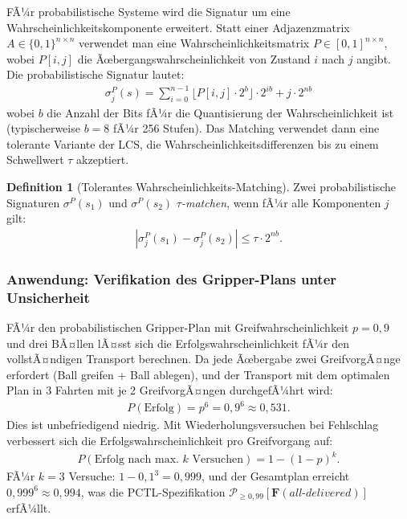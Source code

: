 ﻿\documentclass[a4paper,12pt]{article}
\theoremstyle{definition}
\newtheorem{definition}{Definition}[section]
\begin{document}
FÃ¼r probabilistische Systeme wird die Signatur um eine Wahrscheinlichkeitskomponente erweitert. Statt einer Adjazenzmatrix $A \in \{0,1\}^{n \times n}$ verwendet man eine Wahrscheinlichkeitsmatrix $P \in [0,1]^{n \times n}$, wobei $P[i,j]$ die Ãœbergangswahrscheinlichkeit von Zustand $i$ nach $j$ angibt. Die probabilistische Signatur lautet:
\begin{align}
  \sigma_j^P(s) = \sum_{i=0}^{n-1} \lfloor P[i,j] \cdot 2^b \rfloor \cdot 2^{ib} + j \cdot 2^{nb}
\end{align}
wobei $b$ die Anzahl der Bits fÃ¼r die Quantisierung der Wahrscheinlichkeit ist (typischerweise $b = 8$ fÃ¼r 256 Stufen). Das Matching verwendet dann eine tolerante Variante der LCS, die Wahrscheinlichkeitsdifferenzen bis zu einem Schwellwert $\tau$ akzeptiert.

\begin{definition}[Tolerantes Wahrscheinlichkeits-Matching]
Zwei probabilistische Signaturen $\sigma^P(s_1)$ und $\sigma^P(s_2)$ \emph{$\tau$-matchen}, wenn fÃ¼r alle Komponenten $j$ gilt:
\begin{align}
  |\sigma_j^P(s_1) - \sigma_j^P(s_2)| \leq \tau \cdot 2^{nb}.
\end{align}
\end{definition}

\subsubsection{Anwendung: Verifikation des Gripper-Plans unter Unsicherheit}

FÃ¼r den probabilistischen Gripper-Plan mit Greifwahrscheinlichkeit $p = 0{,}9$ und drei BÃ¤llen lÃ¤sst sich die Erfolgswahrscheinlichkeit fÃ¼r den vollstÃ¤ndigen Transport berechnen. Da jede Ãœbergabe zwei GreifvorgÃ¤nge erfordert (Ball greifen + Ball ablegen), und der Transport mit dem optimalen Plan in 3 Fahrten mit je 2 GreifvorgÃ¤ngen durchgefÃ¼hrt wird:
\begin{align}
  P(\text{Erfolg}) = p^6 = 0{,}9^6 \approx 0{,}531.
\end{align}
Dies ist unbefriedigend niedrig. Mit Wiederholungsversuchen bei Fehlschlag verbessert sich die Erfolgswahrscheinlichkeit pro Greifvorgang auf:
\begin{align}
  P(\text{Erfolg nach max.\ $k$ Versuchen}) = 1 - (1-p)^k.
\end{align}
FÃ¼r $k = 3$ Versuche: $1 - 0{,}1^3 = 0{,}999$, und der Gesamtplan erreicht $0{,}999^6 \approx 0{,}994$, was die PCTL-Spezifikation $\mathcal{P}_{\geq 0{,}99}[\mathbf{F}(\mathit{all\text{-}delivered})]$ erfÃ¼llt.
\end{document}
